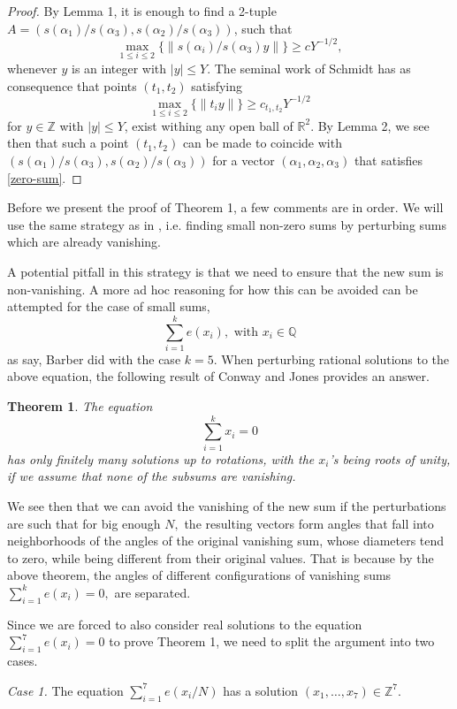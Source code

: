 \documentclass[12pt]{article}
\newtheorem*{utheorem}{Theorem}
\theoremstyle{definition}
\newcommand{\Q}{\mathbb{Q}}
\newcommand{\Z}{\mathbb{Z}}
\begin{document}
\begin{proof}
     By Lemma 1, it is enough to find a 2-tuple $A=(s(\alpha_1)/s(\alpha_3),s(\alpha_2)/s(\alpha_3))$, such that
    \begin{equation}\label{sufficient}
        \max_{1\leq i\leq 2}\{\| s(\alpha_i)/s(\alpha_3)y \|\}\geq c Y^{-1/2},
    \end{equation}
    whenever $y$ is an integer with $|y|\leq Y$. The seminal work of Schmidt \cite{schmidt} has as consequence that points $(t_1,t_2)$ satisfying
    $$ \max_{1\leq i\leq  2}\{\| t_iy\|\}\geq c_{t_1,t_2} Y^{-1/2}  $$
    for $y\in \Z$ with $|y|\leq Y$, exist withing any open ball of $\mathbb{R}^2$. By Lemma 2, we see then that such a point $(t_1,t_2)$ can be made to coincide with $(s(\alpha_1)/s(\alpha_3),s(\alpha_2)/s(\alpha_3))$ for a vector $(\alpha_1,\alpha_2,\alpha_3)$ that satisfies \eqref{zero-sum}.
\end{proof}
Before we present the proof of Theorem 1, a few comments are in order. We will use the same strategy as in \cite{benb}, i.e. finding small non-zero sums by perturbing sums which are already vanishing. 

A potential pitfall in this strategy is that we need to ensure that the new sum is non-vanishing. A more ad hoc reasoning for how this can be avoided can be attempted for the case of small sums,
$$\sum_{i=1}^k e(x_i), \text{  with  } x_i\in\Q  $$
as say, Barber did with the case $k=5$. When perturbing rational solutions to the above equation, the following result of Conway and Jones provides an answer.
\begin{utheorem}
    The equation
    $$  \sum_{i=1}^k x_i=0 $$
    has only finitely many solutions up to rotations, with the $x_i$'s being roots of unity, if we assume that none of the subsums are vanishing.
\end{utheorem}
We see then that we can avoid the vanishing of the new sum if the perturbations are such that for big enough $N,$ the resulting vectors form angles that fall into neighborhoods of the angles of the original vanishing sum, whose diameters tend to zero, while being different from their original values. That is because by the above theorem, the angles of different configurations of vanishing sums $\sum_{i=1}^k e(x_i)=0,$ are separated.

Since we are forced to also consider real solutions to the equation $\sum_{i=1}^7 e(x_i)=0$ to prove Theorem 1, we need to split the argument into two cases.

\textit{Case 1.} The equation $\sum_{i=1}^7 e(x_i/N)$ has a solution $(x_1,\dots,x_7)\in \Z^7$.
\end{document}
